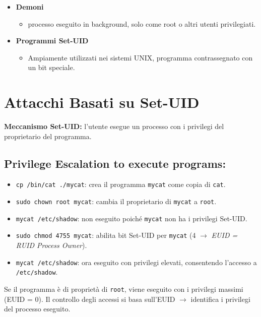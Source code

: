 \begin{itemize}
    \item \textbf{Demoni}
    \begin{itemize}
        \item processo eseguito in background, solo come root o altri utenti privilegiati.
    \end{itemize}
    \item \textbf{Programmi Set-UID}
    \begin{itemize}
        \item Ampiamente utilizzati nei sistemi UNIX, programma contrassegnato con un bit speciale.
    \end{itemize}
\end{itemize}


\section{Attacchi Basati su Set-UID}

\textbf{Meccanismo Set-UID:} l'utente esegue un processo con i privilegi del proprietario del programma. 

\subsection{Privilege Escalation to execute programs:}
\begin{itemize}
    \item \texttt{cp /bin/cat ./mycat}: crea il programma \texttt{mycat} come copia di \texttt{cat}.
    \item \texttt{sudo chown root mycat}: cambia il proprietario di \texttt{mycat} a \texttt{root}.
    \item \texttt{mycat /etc/shadow}: non eseguito poiché \texttt{mycat} non ha i privilegi Set-UID.
    \item \texttt{sudo chmod 4755 mycat}: abilita bit Set-UID per \texttt{mycat} (4 $\rightarrow$ \textit{EUID = RUID Process Owner}).
    \item \texttt{mycat /etc/shadow}: ora eseguito con privilegi elevati, consentendo l'accesso a \texttt{/etc/shadow}.
\end{itemize}

\noindent Se il programma è di proprietà di \texttt{root}, viene eseguito con i privilegi massimi (EUID = 0). Il controllo degli accessi si basa sull'EUID $\rightarrow$ identifica i privilegi del processo eseguito.

